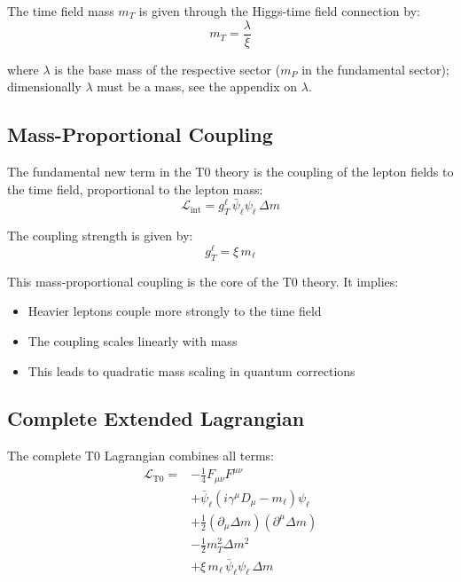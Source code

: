 	The time field mass $m_T$ is given through the Higgs-time field connection by:
	\begin{equation}
		m_T = \frac{\lambda}{\xi}
		\label{eq:time_field_mass_value}
	\end{equation}
	
	where $\lambda$ is the base mass of the respective sector ($m_P$ in the fundamental sector); dimensionally $\lambda$ must be a mass, see the appendix on $\lambda$.
	
	\subsection{Mass-Proportional Coupling}
	
	The fundamental new term in the T0 theory is the coupling of the lepton fields to the time field, proportional to the lepton mass:
	\begin{equation}
		\mathcal{L}_{\text{int}} = g_T^\ell \, \bar{\psi}_\ell \psi_\ell \, \Delta m
		\label{eq:interaction_term}
	\end{equation}
	
	The coupling strength is given by:
	\begin{equation}
		\boxed{g_T^\ell = \xi \, m_\ell}
		\label{eq:coupling_strength}
	\end{equation}
	
	This mass-proportional coupling is the core of the T0 theory. It implies:
	\begin{itemize}
		\item Heavier leptons couple more strongly to the time field
		\item The coupling scales linearly with mass
		\item This leads to quadratic mass scaling in quantum corrections
	\end{itemize}
	
	\subsection{Complete Extended Lagrangian}
	
	The complete T0 Lagrangian combines all terms:
	\begin{equation}
		\begin{split}
			\mathcal{L}_{\text{T0}} = &-\frac{1}{4} F_{\mu\nu}F^{\mu\nu} \\
			&+ \bar{\psi}_\ell(i\gamma^\mu D_\mu - m_\ell)\psi_\ell \\
			&+ \frac{1}{2}(\partial_\mu \Delta m)(\partial^\mu \Delta m) \\
			&- \frac{1}{2} m_T^2 \Delta m^2 \\
			&+ \xi \, m_\ell \,\bar{\psi}_\ell \psi_\ell \, \Delta m
		\end{split}
		\label{eq:full_lagrangian}
	\end{equation}
	
